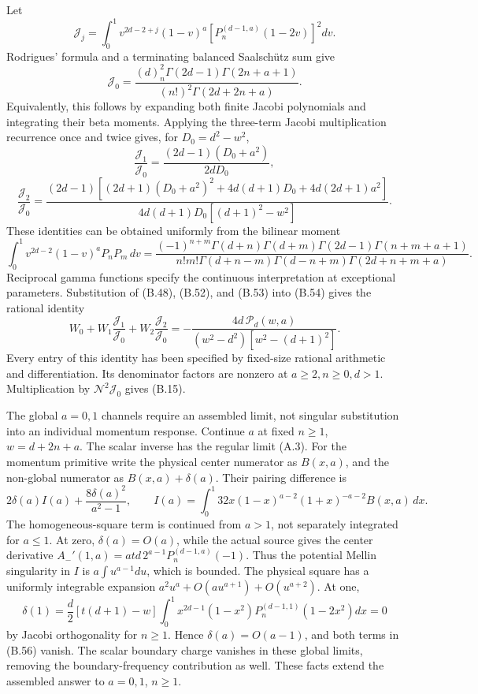 Let \[
\mathcal J_j=\int_0^1v^{2d-2+j}(1-v)^a
[P_n^{(d-1,a)}(1-2v)]^2dv .
\] Rodrigues' formula and a terminating balanced Saalschütz sum give \[
\mathcal J_0=\frac{(d)_n^2\Gamma(2d-1)\Gamma(2n+a+1)}
{(n!)^2\Gamma(2d+2n+a)}.
\] Equivalently, this follows by expanding both finite Jacobi polynomials and integrating their beta moments. Applying the three-term Jacobi multiplication recurrence once and twice gives, for \(D_0=d^2-w^2\), \[
\frac{\mathcal J_1}{\mathcal J_0}
=\frac{(2d-1)(D_0+a^2)}{2dD_0},
\] \[
\frac{\mathcal J_2}{\mathcal J_0}
=\frac{(2d-1)[(2d+1)(D_0+a^2)^2
+4d(d+1)D_0+4d(2d+1)a^2]}
{4d(d+1)D_0[(d+1)^2-w^2]} .
\tag{B.54}
\] These identities can be obtained uniformly from the bilinear moment \[
\int_0^1v^{2d-2}(1-v)^aP_nP_m\,dv
=\frac{(-1)^{n+m}\Gamma(d+n)\Gamma(d+m)\Gamma(2d-1)\Gamma(n+m+a+1)}
{n!m!\Gamma(d+n-m)\Gamma(d-n+m)\Gamma(2d+n+m+a)}.
\] Reciprocal gamma functions specify the continuous interpretation at exceptional parameters. Substitution of (B.48), (B.52), and (B.53) into (B.54) gives the rational identity \[
W_0+W_1\frac{\mathcal J_1}{\mathcal J_0}
+W_2\frac{\mathcal J_2}{\mathcal J_0}
=-\frac{4d\,\mathcal P_d(w,a)}
{(w^2-d^2)[w^2-(d+1)^2]} .
\tag{B.55}
\] Every entry of this identity has been specified by fixed-size rational arithmetic and differentiation. Its denominator factors are nonzero at \(a\ge2,n\ge0,d>1\). Multiplication by \(\mathcal N^2\mathcal J_0\) gives (B.15).

The global \(a=0,1\) channels require an assembled limit, not singular substitution into an individual momentum response. Continue \(a\) at fixed \(n\ge1\), \(w=d+2n+a\). The scalar inverse has the regular limit (A.3). For the momentum primitive write the physical center numerator as \(B(x,a)\), and the non-global numerator as \(B(x,a)+\delta(a)\). Their pairing difference is \[
2\delta(a)I(a)+\frac{8\delta(a)^2}{a^2-1},\qquad
I(a)=\int_0^1 32x(1-x)^{a-2}(1+x)^{-a-2}B(x,a)\,dx .
\tag{B.56}
\] The homogeneous-square term is continued from \(a>1\), not separately integrated for \(a\le1\). At zero, \(\delta(a)=O(a)\), while the actual source gives the center derivative \(A_-'(1,a)=atd\,2^{a-1}P_n^{(d-1,a)}(-1)\). Thus the potential Mellin singularity in \(I\) is \(a\int u^{a-1}du\), which is bounded. The physical square has a uniformly integrable expansion \(a^2u^a+O(au^{a+1})+O(u^{a+2})\). At one, \[
\delta(1)=\frac d2[t(d+1)-w]
\int_0^1x^{2d-1}(1-x^2)
P_n^{(d-1,1)}(1-2x^2)dx=0
\] by Jacobi orthogonality for \(n\ge1\). Hence \(\delta(a)=O(a-1)\), and both terms in (B.56) vanish. The scalar boundary charge vanishes in these global limits, removing the boundary-frequency contribution as well. These facts extend the assembled answer to \(a=0,1\), \(n\ge1\).

